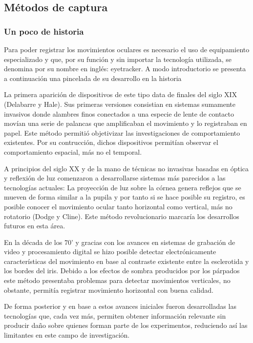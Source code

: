 \documentclass[../main.tex]{subfiles}
\begin{document}
		\subsection{Métodos de captura}
		\label{sub:02_metodos_de_captura}
			\subsubsection{Un poco de historia} 
			\label{ssub:02_un_poco_de_historia_monitores}
			
			Para poder registrar los movimientos oculares es necesario el uso de equipamiento especializado y que, por su función y sin importar la tecnología utilizada, se denomina por su nombre en inglés: \gls{eyetracker}. A modo introductorio se presenta a continuación una pincelada de su desarrollo en la historia \cite{article:eyetracker_eggert, article:eyetracker_richardson}

			La primera aparición de dispositivos de este tipo data de finales del siglo XIX (Delabarre y Hale). Sus primeras versiones consistian en sistemas sumamente invasivos donde alambres finos conectados a una especie de lente de contacto movían una serie de palancas que amplificaban el movimiento y lo registraban en papel. Este método permitió objetivizar las investigaciones de comportamiento existentes. Por su contrucción, dichos dispositivos permitían observar el comportamiento espacial, más no el temporal. 

			A principios del siglo XX y de la mano de técnicas no invasivas basadas en óptica y reflexión de luz comenzaron a desarrollarse sistemas más parecidos a las tecnologías actuales: La proyección de luz sobre la córnea genera reflejos que se mueven de forma similar a la pupila y por tanto si se hace posible su registro, es posible conocer el movimiento ocular tanto horizontal como vertical, más no rotatorio (Dodge y Cline). Este método revolucionario marcaría los desarrollos futuros en esta área.

			En la década de los 70' y gracias con los avances en sistemas de grabación de video y procesamiento digital se hizo posible detectar electrónicamente características del movimiento en base al contraste existente entre la \gls{esclerotida} y los bordes del iris. Debido a los efectos de sombra producidos por los párpados este método presentaba problemas para detectar movimientos verticales, no obstante, permitía registrar movimiento horizontal con buena calidad. 

			De forma posterior y en base a estos avances iniciales fueron desarrolladas las tecnologías que, cada vez más, permiten obtener información relevante sin producir daño sobre quienes forman parte de los experimentos, reduciendo así las limitantes en este campo de investigación.    
\end{document}
